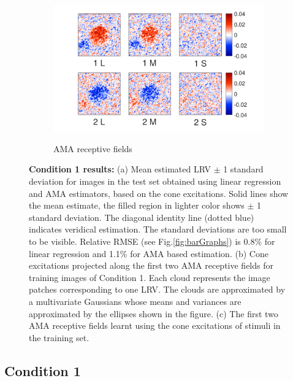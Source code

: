 \documentclass{jov}
\begin{document}
\begin{figure}
\begin{subfigure}[b]{0.26 \textwidth}
        \label{fig:case1RFResponse}
    \end{subfigure}
    \begin{subfigure}[b]{0.4 \textwidth}
	\caption{AMA receptive fields}
	\includegraphics[width=1.0\textwidth, trim={0.2cm -0.cm 0 0.3cm}]{../FiguresDraft4/Figure10/Figure10_c.pdf}
	\label{fig:case1RFs}
    \end{subfigure}   
    \caption{{\bf Condition 1 results:} (a) Mean estimated LRV $\pm$ 1 standard deviation for images in the test set obtained using linear regression and AMA estimators, based on the cone excitations. Solid lines show the mean estimate, the filled region in lighter color shows $\pm$ 1 standard deviation. The diagonal identity line (dotted blue) indicates veridical estimation. The standard deviations are too small to be visible. Relative RMSE (see Fig.\ref{fig:barGraphs}) is 0.8\% for linear regression and 1.1\%  for AMA based estimation. (b) Cone excitations projected along the first two AMA receptive fields for training images of Condition 1. Each cloud represents the image patches corresponding to one LRV. The clouds are approximated by a multivariate Gaussians whose means and variances are approximated by the ellipses shown in the figure. (c) The first two AMA receptive fields learnt using the cone excitations of stimuli in the training set.}
\label{fig:Condition1}
\end{figure}

\subsection{Condition 1}
\end{document}

